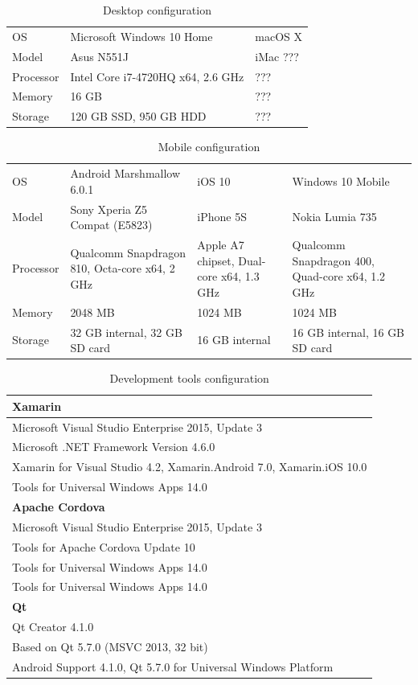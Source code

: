 \documentclass[english,master,public,dept460,male,cpdeclaration,oneside]{diploma}
\begin{document}
\begin{table}
	\centering
	\caption{Desktop configuration}
	\begin{tabular}{p{2cm} | p{4.5cm} p{4.5cm}}
		\toprule
		OS & Microsoft Windows 10 Home & macOS X \\
		Model & Asus N551J & iMac ??? \\
		Processor & Intel Core i7-4720HQ x64, 2.6 GHz & ??? \\
		Memory & 16 GB & ??? \\
		Storage & 120 GB SSD, 950 GB HDD & ??? \\
		\midrule
	\end{tabular}
\end{table}

\begin{table}
	\centering
	\caption{Mobile configuration}
	\begin{tabular}{p{2cm} | p{3.5cm} p{3.5cm} p{3.5cm}}
		\toprule
		OS & Android Marshmallow 6.0.1 & iOS 10 & Windows 10 Mobile \\
		Model & Sony Xperia Z5 Compat (E5823) & iPhone 5S & Nokia Lumia 735 \\
		Processor & Qualcomm Snapdragon 810, Octa-core x64, 2 GHz & Apple A7 chipset, Dual-core x64, 1.3 GHz & Qualcomm Snapdragon 400, Quad-core x64, 1.2 GHz \\
		Memory & 2048 MB & 1024 MB & 1024 MB \\
		Storage & 32 GB internal, 32 GB SD card & 16 GB internal & 16 GB internal, 16 GB SD card \\
		\midrule
	\end{tabular}
\end{table}

\begin{table}
	\centering
	\caption{Development tools configuration}
	\begin{tabular}{l}
		\toprule
		\textbf{Xamarin}\\
		\midrule
		Microsoft Visual Studio Enterprise 2015, Update 3 \\
		Microsoft .NET Framework Version 4.6.0 \\
		Xamarin for Visual Studio 4.2, Xamarin.Android 7.0, Xamarin.iOS 10.0 \\
		Tools for Universal Windows Apps 14.0 \\
		\midrule
		\textbf{Apache Cordova}\\
		\midrule
		Microsoft Visual Studio Enterprise 2015, Update 3 \\
		Tools for Apache Cordova Update 10 \\
		Tools for Universal Windows Apps 14.0 \\
		Tools for Universal Windows Apps 14.0 \\
		\midrule
		\textbf{Qt}\\
		\midrule
		Qt Creator 4.1.0 \\
		Based on Qt 5.7.0 (MSVC 2013, 32 bit) \\
		Android Support 4.1.0, Qt 5.7.0 for Universal Windows Platform \\	
		\midrule	
	\end{tabular}
\end{table}
\end{document}
